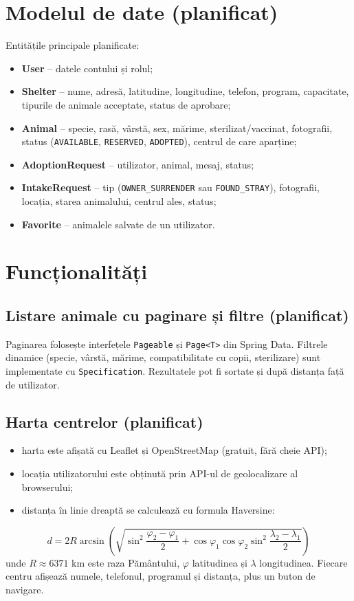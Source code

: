 \documentclass[11pt,a4paper]{article}
\newcommand{\todo}{\textcolor{orange!80!black}{\textbf{planificat}}}
\begin{document}
\section{Modelul de date (\todo)}

Entitățile principale planificate:
\begin{itemize}
  \item \textbf{User} -- datele contului și rolul;
  \item \textbf{Shelter} -- nume, adresă, latitudine, longitudine, telefon, program,
        capacitate, tipurile de animale acceptate, status de aprobare;
  \item \textbf{Animal} -- specie, rasă, vârstă, sex, mărime, sterilizat/vaccinat,
        fotografii, status (\texttt{AVAILABLE}, \texttt{RESERVED}, \texttt{ADOPTED}),
        centrul de care aparține;
  \item \textbf{AdoptionRequest} -- utilizator, animal, mesaj, status;
  \item \textbf{IntakeRequest} -- tip (\texttt{OWNER\_SURRENDER} sau \texttt{FOUND\_STRAY}),
        fotografii, locația, starea animalului, centrul ales, status;
  \item \textbf{Favorite} -- animalele salvate de un utilizator.
\end{itemize}

\section{Funcționalități}

\subsection{Listare animale cu paginare și filtre (\todo)}
Paginarea folosește interfețele \texttt{Pageable} și \texttt{Page<T>} din Spring Data.
Filtrele dinamice (specie, vârstă, mărime, compatibilitate cu copii, sterilizare) sunt
implementate cu \texttt{Specification}. Rezultatele pot fi sortate și după distanța
față de utilizator.

\subsection{Harta centrelor (\todo)}
\begin{itemize}
  \item harta este afișată cu Leaflet și OpenStreetMap (gratuit, fără cheie API);
  \item locația utilizatorului este obținută prin API-ul de geolocalizare al browserului;
  \item distanța în linie dreaptă se calculează cu formula Haversine:
\end{itemize}
\[
d = 2R \arcsin\left(\sqrt{\sin^2\frac{\varphi_2-\varphi_1}{2}
   + \cos\varphi_1 \cos\varphi_2 \sin^2\frac{\lambda_2-\lambda_1}{2}}\right)
\]
unde $R \approx 6371$ km este raza Pământului, $\varphi$ latitudinea și $\lambda$ longitudinea.
Fiecare centru afișează numele, telefonul, programul și distanța, plus un buton de navigare.
\end{document}
